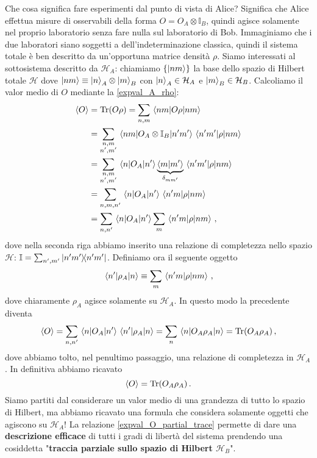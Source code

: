 \noindent Che cosa significa fare esperimenti dal punto di vista di Alice? Significa che Alice effettua misure di osservabili della forma $O = O_A \otimes \mathbb{I}_B$, quindi agisce solamente nel proprio laboratorio senza fare nulla sul laboratorio di Bob. Immaginiamo che i due laboratori siano soggetti a dell'indeterminazione classica, quindi il sistema totale è ben descritto da un'opportuna matrice densità $\rho$. Siamo interessati al sottosistema descritto da $\mathcal{H}_A$: chiamiamo $\{ \ket{nm} \}$ la base dello spazio di Hilbert totale $\mathcal{H}$ dove $\ket{nm} \equiv \ket{n}_A \otimes \ket{m}_B$ con $\ket{n}_A \in \mathcal{H}_A$ e $\ket{m}_B \in \mathcal{H}_B$. Calcoliamo il valor medio di $O$ mediante la \eqref{expval_A_rho}:
\begin{align*}
    \expval{O} &= \Tr (O \rho) = \sum_{n,m} \expval{O \rho}{nm} \\
    &= \sum_{\substack{n,m \\ n', m'}} \mel{nm}{O_A \otimes \mathbb{I}_B}{n'm'} \mel{n'm'}{\rho}{nm} \\
    &= \sum_{\substack{n,m \\ n', m'}} \mel{n}{O_A}{n'} \underbrace{\braket{m}{m'}}_{\delta_{mm'}} \mel{n'm'}{\rho}{nm} \\
    &= \sum_{n,m,n'} \mel{n}{O_A}{n'} \mel{n'm}{\rho}{nm} \\
    &= \sum_{n,n'} \mel{n}{O_A}{n'} \sum_m \mel{n'm}{\rho}{nm} \, ,
\end{align*}
dove nella seconda riga abbiamo inserito una relazione di completezza nello spazio $\mathcal{H}$: $\mathbb{I} = \sum_{n',m'} \ketbra{n'm'}$. Definiamo ora il seguente oggetto
\begin{equation}\label{rho_A}
    \mel{n'}{\rho_A}{n} \equiv \sum_m \mel{n'm}{\rho}{nm} \, ,
\end{equation}
dove chiaramente $\rho_A$ agisce solamente su $\mathcal{H}_A$. In questo modo la precedente diventa
\begin{equation*}
    \expval{O} = \sum_{n,n'} \mel{n}{O_A}{n'} \mel{n'}{\rho_A}{n} = \sum_n \expval{O_A \rho_A}{n} = \Tr (O_A \rho_A) \, ,
\end{equation*}
dove abbiamo tolto, nel penultimo passaggio, una relazione di completezza in $\mathcal{H}_A$. In definitiva abbiamo ricavato
\begin{equation}\label{expval_O_partial_trace}
    \expval{O} = \Tr (O_A \rho_A) \, .
\end{equation}
Siamo partiti dal considerare un valor medio di una grandezza di tutto lo spazio di Hilbert, ma abbiamo ricavato una formula che considera solamente oggetti che agiscono su $\mathcal{H}_A$! La relazione \eqref{expval_O_partial_trace} permette di dare una \textbf{descrizione efficace} di tutti i gradi di libertà del sistema prendendo una cosiddetta "\textbf{traccia parziale sullo spazio di Hilbert $\mathcal{H}_B$}". 


